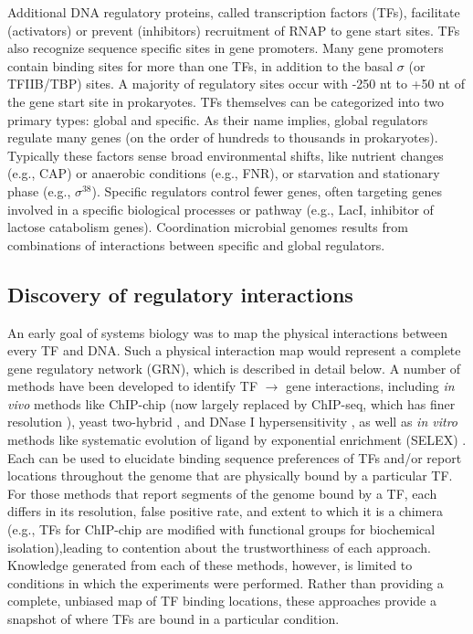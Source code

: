 Additional DNA regulatory proteins, called transcription factors (TFs), facilitate (activators) or prevent (inhibitors) recruitment of RNAP to gene start sites. TFs also recognize sequence specific sites in gene promoters. Many gene promoters contain binding sites for more than one TFs, in addition to the basal $\sigma$ (or TFIIB/TBP) sites. A majority of regulatory sites occur with -250 nt to +50 nt of the gene start site in prokaryotes. TFs themselves can be categorized into two primary types: global and specific. As their name implies, global regulators regulate many genes (on the order of hundreds to thousands in prokaryotes). Typically these factors sense broad environmental shifts, like nutrient changes (e.g., CAP) or anaerobic conditions (e.g., FNR), or starvation and stationary phase (e.g., $\sigma^{38}$). Specific regulators control fewer genes, often targeting genes involved in a specific biological processes or pathway (e.g., LacI, inhibitor of lactose catabolism genes). Coordination microbial genomes results from combinations of interactions between specific and global regulators. 

\subsection{Discovery of regulatory interactions}

An early goal of systems biology was to map the physical interactions between every TF and DNA. Such a physical interaction map would represent a complete gene regulatory network (GRN), which is described in detail below. A number of methods have been developed to identify TF $\rightarrow$ gene interactions, including \textit{in vivo} methods like ChIP-chip \cite{blat_cohesins_1999} (now largely replaced by ChIP-seq, which has finer resolution \cite{johnson_genome-wide_2007}), yeast two-hybrid \cite{fields_novel_1989}, and DNase I hypersensitivity \cite{crawford_identifying_2004}, as well as \textit{in vitro} methods like systematic evolution of ligand by exponential enrichment (SELEX) \cite{blackwell_differences_1990}. Each can be used to elucidate binding sequence preferences of TFs and/or report locations throughout the genome that are physically bound by a particular TF. For those methods that report segments of the genome bound by a TF, each differs in its resolution, false positive rate, and extent to which it is a chimera (e.g., TFs for ChIP-chip are modified with functional groups for biochemical isolation),leading to contention about the trustworthiness of each approach. Knowledge generated from each of these methods, however, is limited to conditions in which the experiments were performed. Rather than providing a complete, unbiased map of TF binding locations, these approaches provide a snapshot of where TFs are bound in a particular condition. 

